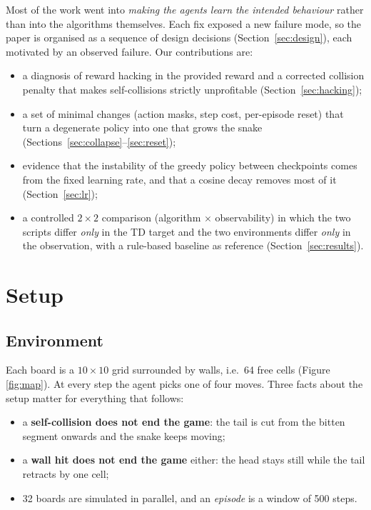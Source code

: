 \documentclass{article}
\begin{document}
Most of the work went into \emph{making the agents learn the intended behaviour} rather than into the algorithms themselves.
Each fix exposed a new failure mode, so the paper is organised as a sequence of design decisions (Section~\ref{sec:design}), each motivated by an observed failure.
Our contributions are:
\begin{itemize}
\item a diagnosis of reward hacking in the provided reward and a corrected collision penalty that makes self-collisions strictly unprofitable (Section~\ref{sec:hacking});
\item a set of minimal changes (action masks, step cost, per-episode reset) that turn a degenerate policy into one that grows the snake (Sections~\ref{sec:collapse}--\ref{sec:reset});
\item evidence that the instability of the greedy policy between checkpoints comes from the fixed learning rate, and that a cosine decay removes most of it (Section~\ref{sec:lr});
\item a controlled $2\times2$ comparison (algorithm $\times$ observability) in which the two scripts differ \emph{only} in the TD target and the two environments differ \emph{only} in the observation, with a rule-based baseline as reference (Section~\ref{sec:results}).
\end{itemize}

\section{Setup}
\label{sec:setup}

\subsection{Environment}
Each board is a $10\times10$ grid surrounded by walls, i.e.\ 64 free cells (Figure \ref{fig:map}).
At every step the agent picks one of four moves.
Three facts about the setup matter for everything that follows:
\begin{itemize}
\item a \textbf{self-collision does not end the game}: the tail is cut from the bitten segment onwards and the snake keeps moving;
\item a \textbf{wall hit does not end the game} either: the head stays still while the tail retracts by one cell;
\item 32 boards are simulated in parallel, and an \emph{episode} is a window of 500 steps.
\end{itemize}
\end{document}
